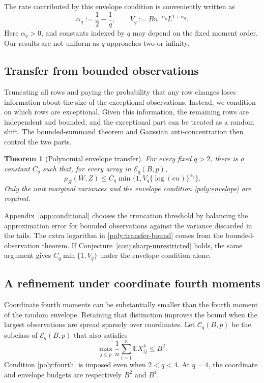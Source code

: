 \documentclass[11pt,letterpaper]{article}
\newtheorem{theorem}{Theorem}
\theoremstyle{remark}
\newcommand{\E}{\mathbb E}
\newcommand{\rh}{\rho_{\mathcal R}}
\begin{document}
The rate contributed by this envelope condition is conveniently written
as
\begin{equation}
 \alpha_q:=\frac12-\frac1q,\qquad
 V_q:=Bn^{-\alpha_q}L^{1+\alpha_q}.
 \label{poly:rates}
\end{equation}
Here \(\alpha_q>0\), and constants indexed by \(q\) may depend on the
fixed moment order. Our results are not uniform as \(q\) approaches two
or infinity.

\subsection{Transfer from bounded observations}\label{poly:transfer-sec}

Truncating all rows and paying the probability that any row changes
loses information about the size of the exceptional observations.
Instead, we condition on which rows are exceptional. Given this
information, the remaining rows are independent and bounded, and the
exceptional part can be treated as a random shift. The bounded-summand
theorem and Gaussian anti-concentration then control the two parts.

\begin{theorem}[Polynomial envelope transfer]\label{poly:transfer}
For every fixed \(q>2\), there is a constant \(C_q\) such that, for
every array in \(\mathcal E_q(B,p)\),
\begin{equation}
 \rh(W,Z)\le C_q\min\{1,V_q\{\log(en)\}^{\alpha_q}\}.
 \label{poly:transfer-bound}
\end{equation}
Only the unit marginal variances and the envelope condition
\eqref{poly:envelope} are required.
\end{theorem}

Appendix~\ref{app:conditional} chooses the truncation threshold by
balancing the approximation error for bounded observations against the
variance discarded in the tails. The extra logarithm in
\eqref{poly:transfer-bound} comes from the bounded-observation theorem.
If Conjecture~\ref{conj:sharp-unrestricted} holds, the same argument
gives \(C_q\min\{1,V_q\}\) under the envelope condition alone.

\subsection{A refinement under coordinate fourth moments}\label{poly:bennett-sec}

Coordinate fourth moments can be substantially smaller than the fourth
moment of the random envelope. Retaining that distinction improves the
bound when the largest observations are spread sparsely over coordinates.
Let \(\mathcal C_q(B,p)\) be the subclass of \(\mathcal E_q(B,p)\)
that also satisfies
\begin{equation}
 \max_{j\le p}\frac1n\sum_{i=1}^n\E X_{ij}^4\le B^2.
 \label{poly:fourth}
\end{equation}
Condition \eqref{poly:fourth} is imposed even when \(2<q<4\).
At \(q=4\), the coordinate and envelope budgets are respectively
\(B^2\) and \(B^4\).
\end{document}
